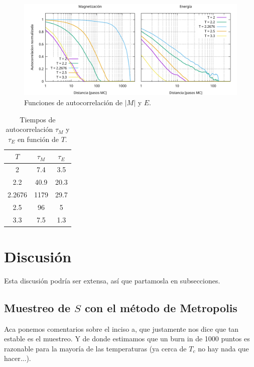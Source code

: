 \documentclass[a4paper,12pt]{article}
\begin{document}
\begin{figure}[h!]
    \centering
    \includegraphics[width = \textwidth]{../img/e.pdf}
    \caption{Funciones de autocorrelación de $|M|$ y $E$.}
    \label{fig:e}
\end{figure}

\newpage

\begin{table}[h!]
    \centering
    \begin{tabular}{c|c|c}
        $T$ & $\tau_M$ & $\tau_E$ \\ \hline
        2 & 7.4 & 3.5 \\
        2.2 & 40.9 & 20.3 \\
        2.2676 & 1179 & 29.7 \\
        2.5 & 96 & 5  \\
        3.3 & 7.5 & 1.3  \\
    \end{tabular}
    \caption{Tiempos de autocorrelación \( \tau_M \) y \( \tau_E \) en función de $T$.}
    \label{tab:tau}
\end{table}

\section{Discusión}

Esta discusión podría ser extensa, así que partamosla en subsecciones.

\subsection{Muestreo de $S$ con el método de Metropolis}



Aca ponemos comentarios sobre el inciso a, que justamente nos dice que tan estable es el muestreo. Y de donde estimamos que un burn in de 1000 puntos es razonable para la mayoría de las temperaturas (ya cerca de $T_c$ no hay nada que hacer...).
\end{document}
